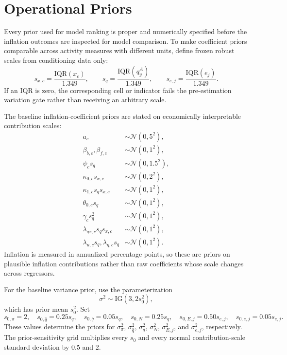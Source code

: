 \documentclass[11pt]{article}
\newcommand{\Normal}{\mathcal{N}}
\begin{document}
\section{Operational Priors}

Every prior used for model ranking is proper and numerically specified before the inflation outcomes are inspected for model comparison. To make coefficient priors comparable across activity measures with different units, define frozen robust scales from conditioning data only:
\begin{equation}
s_{x,c}=\frac{\mathrm{IQR}(x_c)}{1.349},
\qquad
s_q=\frac{\mathrm{IQR}(q_y^A)}{1.349},
\qquad
s_{e,j}=\frac{\mathrm{IQR}(e_j)}{1.349}.
\end{equation}
If an IQR is zero, the corresponding cell or indicator fails the pre-estimation variation gate rather than receiving an arbitrary scale.

The baseline inflation-coefficient priors are stated on economically interpretable contribution scales:
\begin{align}
a_c&\sim\Normal(0,5^2),\\
\beta_{b,c},\beta_{f,c}&\sim\Normal(0,1^2),\\
\psi_cs_q&\sim\Normal(0,1.5^2),\\
\kappa_{0,c}s_{x,c}&\sim\Normal(0,2^2),\\
\kappa_{1,c}s_qs_{x,c}&\sim\Normal(0,1^2),\\
\theta_{0,c}s_q&\sim\Normal(0,1^2),\\
\gamma_cs_q^2&\sim\Normal(0,1^2),\\
\lambda_{qx,c}s_qs_{x,c}&\sim\Normal(0,1^2),\\
\lambda_{u,c}s_q,\lambda_{\eta,c}s_q&\sim\Normal(0,1^2).
\end{align}
Inflation is measured in annualized percentage points, so these are priors on plausible inflation contributions rather than raw coefficients whose scale changes across regressors.

For the baseline variance prior, use the parameterization
\begin{equation}
\sigma^2\sim\mathrm{IG}(3,2s_0^2),
\end{equation}
which has prior mean $s_0^2$. Set
\begin{equation}
s_{0,\pi}=2,
\quad s_{0,\hat q}=0.25s_q,
\quad s_{0,\bar q}=0.05s_q,
\quad s_{0,N}=0.25s_q,
\quad s_{0,E,j}=0.50s_{e,j},
\quad s_{0,e,j}=0.05s_{e,j}.
\end{equation}
These values determine the priors for $\sigma_{\pi}^2$, $\sigma_{\hat q}^2$, $\sigma_{\bar q}^2$, $\sigma_N^2$, $\sigma_{E,j}^2$, and $\sigma_{e,j}^2$, respectively. The prior-sensitivity grid multiplies every $s_0$ and every normal contribution-scale standard deviation by $0.5$ and $2$.
\end{document}
